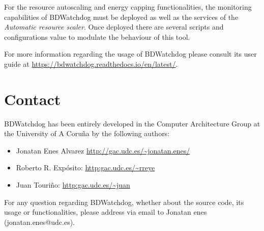 \documentclass[12pt]{article}
\begin{document}
For the resource autoscaling and energy capping functionalities, the monitoring capabilities of BDWatchdog must be deployed as well as the services of the \textit{Automatic resource scaler}. Once deployed there are several scripts and configurations value to modulate the behaviour of this tool. 

For more information regarding the usage of BDWatchdog please consult its user guide at \url{https://bdwatchdog.readthedocs.io/en/latest/}.

\section{Contact}

BDWatchdog has been entirely developed in the Computer Architecture Group at the University of A
Coru\~na by the following authors:


\begin{itemize}{}{}
	\item Jonatan Enes Alvarez \url{http://gac.udc.es/~jonatan.enes/}
	\item Roberto R. Exp\'osito: \url{http:gac.udc.es/~rreye}
	\item Juan Touri\~no: \url{http:gac.udc.es/~juan}
\end{itemize}

For any question regarding BDWatchdog, whether about the source code, its usage or functionalities, please address via email to Jonatan enes (jonatan.enes@udc.es).
\end{document}

